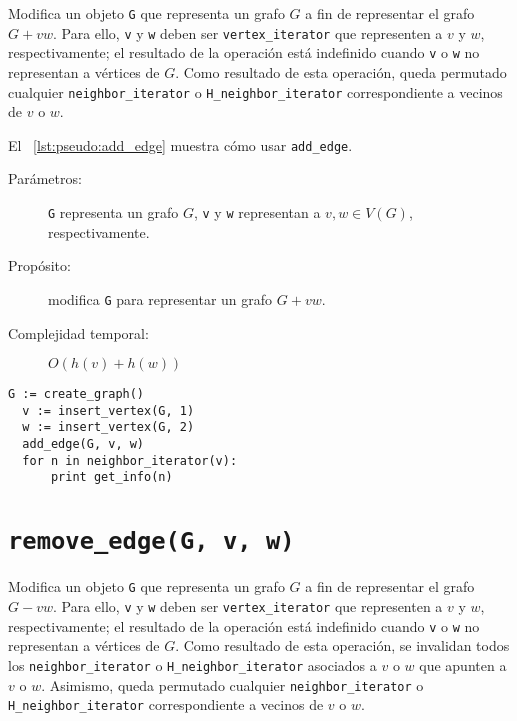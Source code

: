 \documentclass[%
    a4paper,%
    fontsize=12pt,%
    DIV=12,
    twoside,%
    openright,%
    titlepage=true,%
    headsepline,%
    toc=bibliography,%
    parskip=half,%
    cleardoublepage=empty,%
    headings=big,%
]{scrbook}
\makeatletter
\newcommand{\Code}[2][]{\lstinline[basicstyle={\ttfamily},#1]@#2@}
\makeatother
\begin{document}
Modifica un objeto \Code{G} que representa un grafo $G$ a fin de representar el grafo $G + vw$.   Para ello, \Code{v} y \Code{w} deben ser \Code{vertex_iterator} que representen a $v$ y $w$, respectivamente; el resultado de la operación está indefinido cuando \Code{v} o \Code{w} no representan a vértices de $G$.  Como resultado de esta operación, queda permutado cualquier \Code{neighbor_iterator} o \Code{H_neighbor_iterator} correspondiente a vecinos de $v$ o $w$.

El \lstlistingname~\ref{lst:pseudo:add_edge} muestra cómo usar \Code{add_edge}.

\begin{description}
  \item [Parámetros:] \Code{G} representa un grafo $G$, \Code{v} y \Code{w} representan a $v, w \in V(G)$, respectivamente.
  \item [Propósito:] modifica \Code{G} para representar un grafo $G + vw$.
  \item [Complejidad temporal:] $O(h(v) + h(w))$
\end{description}


\begin{lstlisting}[caption={Ejemplo de uso de \Code{add_edge} para imprimir 2. Ver Sección~\ref{sec:tad grafo:neighbor-iterator} para más información de \Code{neghbor_iterator}.},gobble=2,float=ht,label={lst:pseudo:add_edge},emph={add_edge}]
  G := create_graph()
  v := insert_vertex(G, 1)
  w := insert_vertex(G, 2)
  add_edge(G, v, w)
  for n in neighbor_iterator(v):
      print get_info(n)
\end{lstlisting}


\section{\texorpdfstring{\Code{remove_edge(G, v, w)}}{remove\_edge(G, v, w)}}
\label{sec:tad grafo:remove-edge}

Modifica un objeto \Code{G} que representa un grafo $G$ a fin de representar el grafo $G - vw$.  Para ello, \Code{v} y \Code{w} deben ser \Code{vertex_iterator} que representen a $v$ y $w$, respectivamente; el resultado de la operación está indefinido cuando \Code{v} o \Code{w} no representan a vértices de $G$.  Como resultado de esta operación, se invalidan todos los \Code{neighbor_iterator} o \Code{H_neighbor_iterator} asociados a $v$ o $w$ que apunten a $v$ o $w$.  Asimismo, queda permutado cualquier \Code{neighbor_iterator} o \Code{H_neighbor_iterator} correspondiente a vecinos de $v$ o $w$.
\end{document}
